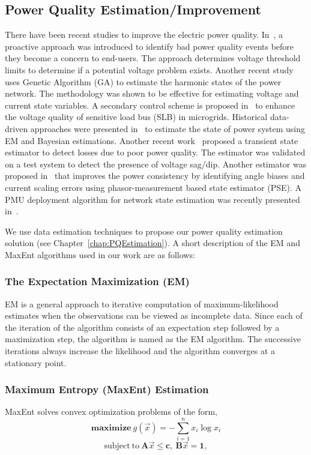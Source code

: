\subsection{Power Quality Estimation/Improvement}
There have been recent studies to improve the electric power quality. In~\cite{mcbee2012utilizing}, a proactive approach was introduced to identify bad power quality events before they become a concern to end-users. The approach determines voltage threshold limits to determine if a potential voltage problem exists. Another recent study~\cite{almeida2013harmonic} uses Genetic Algorithm (GA) to estimate the harmonic states of the power network. The methodology was shown to be effective for estimating voltage and current state variables. A secondary control scheme is proposed in~\cite{savaghebi2012secondary} to enhance the voltage quality of sensitive load bus (SLB) in microgrids. Historical data-driven approaches were presented in~\cite{weng2013historical, weng2014data} to estimate the state of power system using EM and Bayesian estimations. Another recent work~\cite{farzanehrafat2013power} proposed a transient state estimator to detect losses due to poor power quality. The estimator was validated on a test system to detect the presence of voltage sag/dip. Another estimator was proposed in~\cite{ghiocel2014phasor} that improves the power consistency by identifying angle biases and current scaling errors using phasor-measurement based state estimator (PSE). A PMU deployment algorithm for network state estimation was recently presented in~\cite{damavandirobust}.

We use data estimation techniques to propose our power quality estimation solution (see Chapter~\ref{chap:PQEstimation}). A short description of the EM and MaxEnt algorithms used in our work are as follows:

\subsubsection{The Expectation Maximization (EM)} EM is a general approach to iterative computation of maximum-likelihood estimates when the observations can be viewed as incomplete data. Since each of the iteration of the algorithm consists of an expectation step followed by a maximization step, the algorithm is named as the EM algorithm. The successive iterations always increase the likelihood and the algorithm converges at a stationary point.

\subsubsection{Maximum Entropy (MaxEnt) Estimation} MaxEnt solves convex optimization problems of the form,
\[\mathrm{\mathbf{maximize}}~g(\vec{x}) = - \sum_{i=1}^n x_i \log x_i \]
\[\mathrm{subject~to~} \mathbf{A}\vec{x} \leq \mathbf{c},~ \mathbf{B}\vec{x} = \mathbf{1},\]


